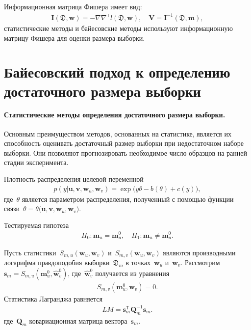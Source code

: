 Информационная матрица Фишера имеет вид:
\[
\label{eq:ps:6}
\begin{aligned}
	\textbf{I}\left(\mathfrak{D}, \textbf{w}\right) = -\nabla\nabla^{\mathsf{T}}l\left(\mathfrak{D}, \textbf{w}\right), \quad  \textbf{V} = \textbf{I}^{-1}\left(\mathfrak{D}, \textbf{m}\right),
\end{aligned}
\]
статистические методы и байесовские методы используют информационную матрицу Фишера для оценки размера выборки.

\section{Байесовский подход к определению достаточного размера выборки}

\paragraph{Статистические методы определения достаточного размера выборки.}
Основным преимуществом методов, основанных на статистике, является их способность оценивать достаточный размер выборки при недостаточном наборе выборки. Они позволяют прогнозировать необходимое число образцов на ранней стадии эксперимента.

Плотность распределения целевой переменной
\[
\label{eq:sb:1}
\begin{aligned}
	p(y|\textbf{u},\textbf{v},\textbf{w}_{u},\textbf{w}_{v}) = \exp\bigl(y\theta- b(\theta) + c\left(y\right)\bigr),
\end{aligned}
\]
где~$\theta$ является параметром распределения, полученный с помощью функции связи~$\theta=\theta\bigr(\textbf{u},\textbf{v},\textbf{w}_{u},\textbf{w}_{v}\bigr)$.

Тестируемая гипотеза
\[
\label{eq:sb:2}
\begin{aligned}
	H_0: \textbf{m}_{u} = \textbf{m}^0_{u}, \quad H_1: \textbf{m}_{u} \not= \textbf{m}^0_{u}.
\end{aligned}
\]

Пусть статистики~$S_{m,u}\left(\textbf{w}_{u}, \textbf{w}_{v}\right)$ и~$S_{m,v}\left(\textbf{w}_{u}, \textbf{w}_{v}\right)$ являются производными логарифма правдоподобия выборки~$\mathfrak{D}_{m}$ в точках~$\textbf{w}_{u}$ и~$\textbf{w}_{v}$.
Рассмотрим~$\textbf{s}_{m} = S_{m,u}\left(\textbf{m}^{0}_{u}, \hat{\textbf{w}}^{0}_{v}\right)$, где~$\hat{\textbf{w}}^{0}_{v}$ получается из уравнения
\[
\label{eq:sb:3}
\begin{aligned}
	S_{m,v}\left(\textbf{m}^{0}_{u}, \textbf{w}_{v}\right) = 0.
\end{aligned}
\]
Статистика Лагранджа равняется
\[
\label{eq:sb:4}
\begin{aligned}
	LM = \textbf{s}^{\mathsf{T}}_{m}\textbf{Q}_{m}^{-1}\textbf{s}_{m}.
\end{aligned}
\]
где~$\textbf{Q}_{m}$ ковариационная матрица вектора~$\textbf{s}_{m}$.
	
